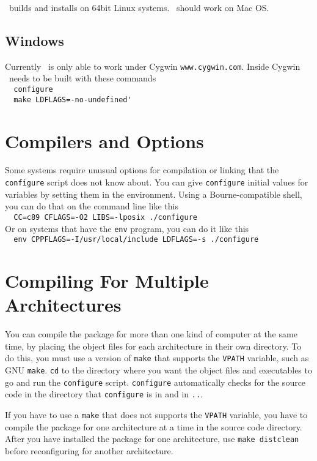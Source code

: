 \begin{appendix}
\GLOBES\ builds and installs on 64bit Linux systems.
\GLOBES\ should work on Mac OS.

\subsection*{Windows}


Currently \GLOBES\ is only able to work under Cygwin \verb+www.cygwin.com+.
Inside Cygwin \GLOBES\ needs to be built with these commands\\
\verb+  configure+\\
\verb+  make LDFLAGS=-no-undefined'+

\section*{Compilers and Options}

   Some systems require unusual options for compilation or linking that
the \verb+configure+ script does not know about.  You can give \verb+configure+
initial values for variables by setting them in the environment.  Using
a Bourne-compatible shell, you can do that on the command line like
this\\
\verb+  CC=c89 CFLAGS=-O2 LIBS=-lposix ./configure+\\

Or on systems that have the \verb+env+ program, you can do it like this\\
\verb+  env CPPFLAGS=-I/usr/local/include LDFLAGS=-s ./configure+

\section*{Compiling For Multiple Architectures}


   You can compile the package for more than one kind of computer at the
same time, by placing the object files for each architecture in their
own directory.  To do this, you must use a version of \verb+make+ that
supports the \verb+VPATH+ variable, such as GNU \verb+make+.  \verb+cd+ to the
directory where you want the object files and executables to go and run
the \verb+configure+ script.  \verb+configure+ automatically checks for the
source code in the directory that \verb+configure+ is in and in \verb+..+.

   If you have to use a \verb+make+ that does not supports the \verb+VPATH+
variable, you have to compile the package for one architecture at a time
in the source code directory.  After you have installed the package for
one architecture, use \verb+make distclean+ before reconfiguring for another
architecture.


\end{appendix}
